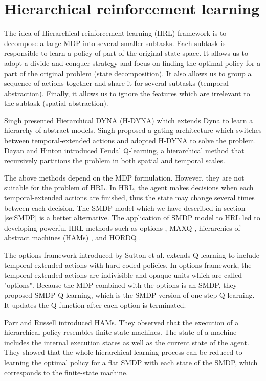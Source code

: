 \section{Hierarchical reinforcement learning}
\label{se:HRL}
The idea of Hierarchical reinforcement learning (HRL) framework is to decompose
a large MDP into several smaller subtasks. Each subtask is responsible to
learn a policy of part of the original state space.
It allows us to adopt a divide-and-conquer
strategy and focus on finding the optimal policy for a part of
the original problem (state decomposition).
It also allows us to group a sequence of actions together and share
it for several subtasks (temporal abstraction). Finally, it allows us to ignore the features which
are irrelevant to the subtask (spatial abstraction).

Singh \cite{Singh92} presented Hierarchical DYNA (H-DYNA) which extends Dyna
to learn a hierarchy of abstract models. Singh proposed a gating architecture which switches
between temporal-extended actions and adopted H-DYNA to solve the problem. 
Dayan and Hinton \cite{Dayan95} introduced Feudal Q-learning, a hierarchical method that
recursively partitions the problem in both spatial and temporal scales. 

The above methods depend on the MDP formulation. However, they are not suitable for the problem of HRL.
In HRL, the agent makes decisions when each temporal-extended actions are finished, thus the state
may change several times between each decision. The SMDP model which we have described
in section \ref{se:SMDP} is a better alternative. The application of SMDP model
to HRL led to developing powerful HRL methods such as options \cite{SMDP},
MAXQ \cite{MaxQJ}, hierarchies of abstract machines (HAMs) \cite{HAMQ}, and 
HORDQ \cite{HORDQ}.

The options framework introduced by Sutton et al. \cite{SMDP} extends
Q-learning to include temporal-extended actions with hard-coded policies.
In options framework, the temporal-extended actions are indivisible and opaque units which are called "options".
Because the MDP combined with the options is an SMDP, they proposed SMDP Q-learning, which is
the SMDP version of one-step Q-learning. It updates the Q-function after each option is terminated.

Parr and Russell \cite{HAMQ} introduced HAMs. They observed that the execution of a hierarchical policy
resembles finite-state machines. The state of a machine includes the internal execution states as well as
the current state of the agent. They showed that the whole hierarchical learning process can be reduced to
learning the optimal policy for a flat SMDP with each state of the SMDP, which corresponds to the finite-state machine.

